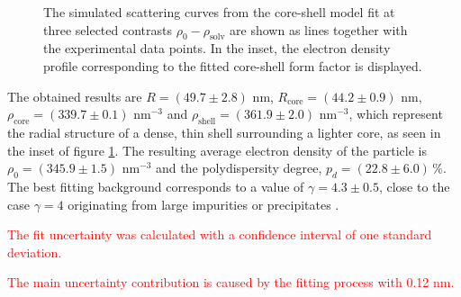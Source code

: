 \begin{figure}%
	\centering
		
		\caption[Core-shell model fit to the PS-COOH particles experimental data.]{The simulated scattering curves from the core-shell model fit at three selected contrasts $\rho_0-\rho_{\text{solv}}$ are shown as lines together with the experimental data points. In the inset, the electron density profile corresponding to the fitted core-shell form factor is displayed.}
		\label{fig:KiskerSAXSCoreshellFit}
\end{figure}

The obtained results are \(R=\left(49.7 \pm 2.8\right) \) nm, \(R_{\text{core}}=\left(44.2 \pm 0.9\right) \) nm, \(\rho_{\text{core}}=\left(339.7 \pm 0.1\right)\) nm\(^{-3}\) and \(\rho_{\text{shell}}=\left(361.9 \pm 2.0\right)\) nm\(^{-3}\), which represent the radial structure of a dense, thin shell surrounding a lighter core, as seen in the inset of figure \ref{fig:KiskerSAXSCoreshellFit}. The resulting average electron density of the particle is \(\rho_{0}=\left(345.9 \pm 1.5\right)\) nm\(^{-3}\) and the polydispersity degree, \(p_d=\left(22.8\pm 6.0\right)\,\%\). The best fitting background corresponds to a value of \( \gamma = 4.3\pm 0.5 \), close to the case \( \gamma = 4 \) originating from large impurities or precipitates \citep{pedersen_determination_1994}. 



\textcolor{red}{The fit uncertainty was calculated with a confidence interval of one standard deviation.}

\textcolor{red}{The main uncertainty contribution is caused by the fitting process with 0.12 nm.}

